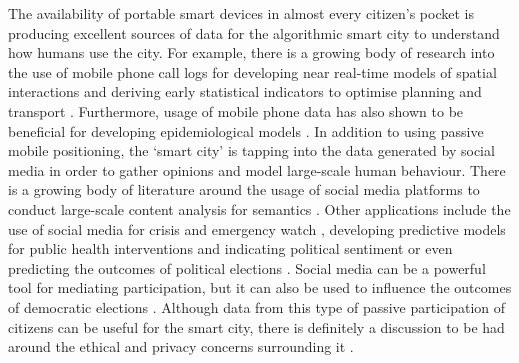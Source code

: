 The availability of portable smart devices in almost every citizen's pocket is producing excellent sources of data for the algorithmic smart city to understand how humans use the city. For example, there is a growing body of research into the use of mobile phone call logs for developing near real-time models of spatial interactions \citep{ahas_using_2010,vanhoof_exploring_2017} and deriving early statistical indicators to optimise planning and transport \citep{sonntag_feasibility_2014}. Furthermore, usage of mobile phone data has also shown to be beneficial for developing epidemiological models \citep{finger_mobile_2016,panigutti_assessing_2017}. In addition to using passive mobile positioning, the `smart city' is tapping into the data generated by social media in order to gather opinions and model large-scale human behaviour. There is a growing body of literature around the usage of social media platforms to conduct large-scale content analysis for semantics \citep{sizov_geofolk_2010,golder_diurnal_2011,cranshaw_livehoods_2012, procter_reading_2013,bontcheva_making_2014}. Other applications include the use of social media for crisis and emergency watch \citep{kamel_boulos_crowdsourcing_2011,liu_crisis_2014}, developing predictive models for public health interventions \citep{chourabi_understanding_2012} and indicating political sentiment or even predicting the outcomes of political elections \citep{tumasjan_predicting_2010}. Social media can be a powerful tool for mediating participation, but it can also be used to influence the outcomes of democratic elections \citep{bond_61-million-person_2012}. Although data from this type of passive participation of citizens can be useful for the smart city, there is definitely a discussion to be had around the ethical and privacy concerns surrounding it \citep{lanier_who_2014,van_dijck_datafication_2014}.

